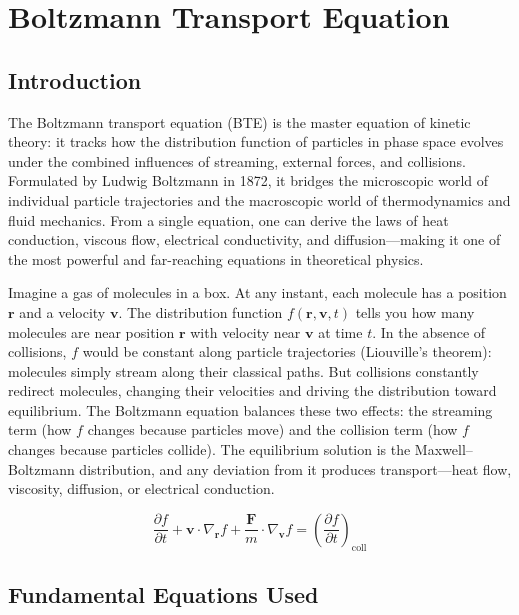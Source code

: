 \chapter{Boltzmann Transport Equation}

\section*{Introduction}

The Boltzmann transport equation (BTE) is the master equation of kinetic theory: it tracks how the distribution function of particles in phase space evolves under the combined influences of streaming, external forces, and collisions. Formulated by Ludwig Boltzmann in 1872, it bridges the microscopic world of individual particle trajectories and the macroscopic world of thermodynamics and fluid mechanics. From a single equation, one can derive the laws of heat conduction, viscous flow, electrical conductivity, and diffusion---making it one of the most powerful and far-reaching equations in theoretical physics.

Imagine a gas of molecules in a box. At any instant, each molecule has a position $\mathbf{r}$ and a velocity $\mathbf{v}$. The distribution function $f(\mathbf{r}, \mathbf{v}, t)$ tells you how many molecules are near position $\mathbf{r}$ with velocity near $\mathbf{v}$ at time $t$. In the absence of collisions, $f$ would be constant along particle trajectories (Liouville's theorem): molecules simply stream along their classical paths. But collisions constantly redirect molecules, changing their velocities and driving the distribution toward equilibrium. The Boltzmann equation balances these two effects: the streaming term (how $f$ changes because particles move) and the collision term (how $f$ changes because particles collide). The equilibrium solution is the Maxwell--Boltzmann distribution, and any deviation from it produces transport---heat flow, viscosity, diffusion, or electrical conduction.


\begin{equation}
\frac{\partial f}{\partial t} + \mathbf{v}\cdot\nabla_{\mathbf{r}} f + \frac{\mathbf{F}}{m}\cdot\nabla_{\mathbf{v}} f = \left(\frac{\partial f}{\partial t}\right)_{\text{coll}}
\end{equation}

\section*{Fundamental Equations Used}

